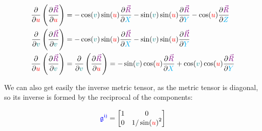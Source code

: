 \begin{align*}
    \frac{\partial}{\partial \begingroup\color{red}u\endgroup}\left(\frac{\partial \begingroup\color{violet}\vec{R}\endgroup}{\partial \begingroup\color{red}u\endgroup}\right) &=
    -\cos(\begingroup\color{teal}v\endgroup)\sin(\begingroup\color{red}u\endgroup)\frac{\partial \begingroup\color{violet}\vec{R}\endgroup}{\partial \begingroup\color{cyan}X\endgroup}
    -\sin(\begingroup\color{teal}v\endgroup)\sin(\begingroup\color{red}u\endgroup)\frac{\partial \begingroup\color{violet}\vec{R}\endgroup}{\partial \begingroup\color{cyan}Y\endgroup}
    -\cos(\begingroup\color{red}u\endgroup)\frac{\partial \begingroup\color{violet}\vec{R}\endgroup}{\partial \begingroup\color{cyan}Z\endgroup}\\
    \frac{\partial}{\partial \begingroup\color{teal}v\endgroup}\left(\frac{\partial \begingroup\color{violet}\vec{R}\endgroup}{\partial \begingroup\color{teal}v\endgroup}\right) &=
    -\cos(\begingroup\color{teal}v\endgroup)\sin(\begingroup\color{red}u\endgroup)\frac{\partial \begingroup\color{violet}\vec{R}\endgroup}{\partial \begingroup\color{cyan}X\endgroup}
    -\sin(\begingroup\color{teal}v\endgroup)\sin(\begingroup\color{red}u\endgroup)\frac{\partial \begingroup\color{violet}\vec{R}\endgroup}{\partial \begingroup\color{cyan}Y\endgroup}\\
    \frac{\partial}{\partial \begingroup\color{red}u\endgroup}\left(\frac{\partial \begingroup\color{violet}\vec{R}\endgroup}{\partial \begingroup\color{teal}v\endgroup}\right) &=
    \frac{\partial}{\partial \begingroup\color{teal}v\endgroup}\left(\frac{\partial \begingroup\color{violet}\vec{R}\endgroup}{\partial \begingroup\color{red}u\endgroup}\right) =
    -\sin(\begingroup\color{teal}v\endgroup)\cos(\begingroup\color{red}u\endgroup)\frac{\partial \begingroup\color{violet}\vec{R}\endgroup}{\partial \begingroup\color{cyan}X\endgroup}
    + \cos(\begingroup\color{teal}v\endgroup)\cos(\begingroup\color{red}u\endgroup)\frac{\partial \begingroup\color{violet}\vec{R}\endgroup}{\partial \begingroup\color{cyan}Y\endgroup}
\end{align*}

We can also get easily the inverse metric tensor, as the metric tensor is diagonal, so its inverse is formed by the reciprocal of the components:

\begin{equation}
    \begingroup\color{blue}\mathfrak{g^{ij}}\endgroup = 
    \begin{bmatrix}
        1 & 0\\
        0 & 1/\sin(\begingroup\color{red}u\endgroup)^2
    \end{bmatrix}
\end{equation}

